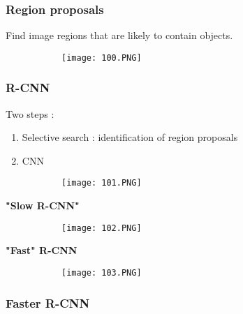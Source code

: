 \documentclass{article}
\begin{document}
\subsubsection{Region proposals}

Find image regions that are likely to contain objects.

\begin{figure}[ht!]
  \centering
  \begin{subfigure}[b]{0.5\linewidth}
    \texttt{[image: 100.PNG]}
  \end{subfigure}
\end{figure}

\subsubsection{R-CNN}

Two steps : 

\begin{enumerate}
    \item Selective search : identification of region proposals
    \item  CNN
\end{enumerate}

\begin{figure}[ht!]
  \centering
  \begin{subfigure}[b]{0.7\linewidth}
    \texttt{[image: 101.PNG]}
  \end{subfigure}
\end{figure}


\textbf{"Slow R-CNN"}

\begin{figure}[ht!]
  \centering
  \begin{subfigure}[b]{0.7\linewidth}
    \texttt{[image: 102.PNG]}
  \end{subfigure}
\end{figure}

\vspace{40mm}

\textbf{"Fast" R-CNN}

\begin{figure}[ht!]
  \centering
  \begin{subfigure}[b]{0.7\linewidth}
    \texttt{[image: 103.PNG]}
  \end{subfigure}
\end{figure}

\subsubsection{Faster R-CNN}
\end{document}
